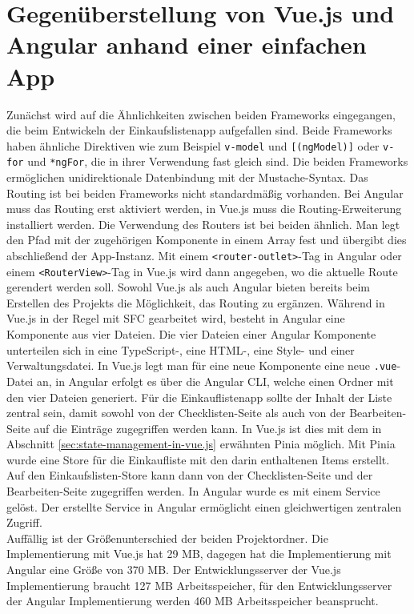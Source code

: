 \section{Gegenüberstellung von Vue.js und Angular anhand einer einfachen App}
Zunächst wird auf die Ähnlichkeiten zwischen beiden Frameworks eingegangen, die beim Entwickeln der Einkaufslistenapp aufgefallen sind.
Beide Frameworks haben ähnliche Direktiven wie zum Beispiel \texttt{v-model} und \texttt{[(ngModel)]} oder \texttt{v-for} und \texttt{*ngFor},
die in ihrer Verwendung fast gleich sind.
Die beiden Frameworks ermöglichen unidirektionale Datenbindung mit der Mustache-Syntax.
Das Routing ist bei beiden Frameworks nicht standardmäßig vorhanden.
Bei Angular muss das Routing erst aktiviert werden, in Vue.js muss die Routing-Erweiterung installiert werden.
Die Verwendung des Routers ist bei beiden ähnlich.
Man legt den Pfad mit der zugehörigen Komponente in einem Array fest
und übergibt dies abschließend der App-Instanz.
Mit einem \texttt{<router-outlet>}-Tag in Angular oder einem \texttt{<RouterView>}-Tag in Vue.js wird dann angegeben, wo die aktuelle Route gerendert werden soll.
Sowohl Vue.js als auch Angular bieten bereits beim Erstellen des Projekts die Möglichkeit, das Routing zu ergänzen.
Während in Vue.js in der Regel mit SFC gearbeitet wird, besteht in Angular eine Komponente aus vier Dateien.
Die vier Dateien einer Angular Komponente unterteilen sich in eine TypeScript-, eine HTML-, eine Style- und einer Verwaltungsdatei.
In Vue.js legt man für eine neue Komponente eine neue \texttt{.vue}-Datei an,
in Angular erfolgt es über die Angular CLI, welche einen Ordner mit den vier Dateien generiert.
Für die Einkauflistenapp sollte der Inhalt der Liste zentral sein, damit sowohl von der Checklisten-Seite als auch von der Bearbeiten-Seite
auf die Einträge zugegriffen werden kann.
In Vue.js ist dies mit dem in Abschnitt \ref{sec:state-management-in-vue.js} erwähnten Pinia möglich.
Mit Pinia wurde eine Store für die Einkaufliste mit den darin enthaltenen Items erstellt.
Auf den Einkaufslisten-Store kann dann von der Checklisten-Seite und der Bearbeiten-Seite zugegriffen werden.
In Angular wurde es mit einem Service gelöst.
Der erstellte Service in Angular ermöglicht einen gleichwertigen zentralen Zugriff.
\\
Auffällig ist der Größenunterschied der beiden Projektordner.
Die Implementierung mit Vue.js hat 29 MB, dagegen hat die Implementierung mit Angular eine Größe von 370 MB.
Der Entwicklungsserver der Vue.js Implementierung braucht 127 MB Arbeitsspeicher, für den Entwicklungsserver der Angular Implementierung
werden 460 MB Arbeitsspeicher beansprucht.




